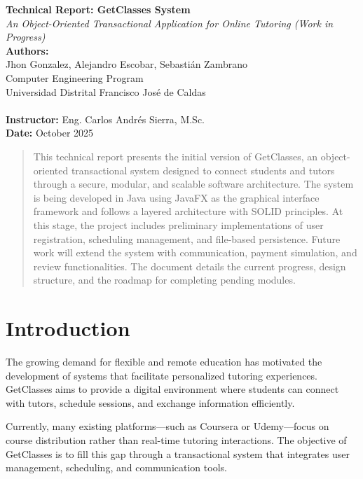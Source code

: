 \documentclass[12pt,a4paper]{report}
\begin{document}
\begin{titlepage}
\centering
\vspace*{2cm}
\Huge\textbf{Technical Report: GetClasses System}\\[0.5cm]
\Large\textit{An Object-Oriented Transactional Application for Online Tutoring (Work in Progress)}\\[2cm]
\Large\textbf{Authors:}\\[0.2cm]
Jhon Gonzalez, Alejandro Escobar, Sebasti\'an Zambrano\\[0.3cm]
Computer Engineering Program\\
Universidad Distrital Francisco Jos\'e de Caldas\\[0.3cm]
\\[2cm]
\Large\textbf{Instructor:} Eng. Carlos Andr\'es Sierra, M.Sc.\\[1cm]
\Large\textbf{Date:} October 2025\\[2cm]
\vfill
\end{titlepage}



\begin{abstract}
This technical report presents the initial version of GetClasses, an object-oriented transactional system designed to connect students and tutors through a secure, modular, and scalable software architecture. The system is being developed in Java using JavaFX as the graphical interface framework and follows a layered architecture with SOLID principles. At this stage, the project includes preliminary implementations of user registration, scheduling management, and file-based persistence. Future work will extend the system with communication, payment simulation, and review functionalities. The document details the current progress, design structure, and the roadmap for completing pending modules.
\end{abstract}

\tableofcontents
\listoffigures
\listoftables
\newpage

\chapter{Introduction}
The growing demand for flexible and remote education has motivated the development of systems that facilitate personalized tutoring experiences. GetClasses aims to provide a digital environment where students can connect with tutors, schedule sessions, and exchange information efficiently.


Currently, many existing platforms—such as Coursera or Udemy—focus on course distribution rather than real-time tutoring interactions. The objective of GetClasses is to fill this gap through a transactional system that integrates user management, scheduling, and communication tools.
\end{document}
